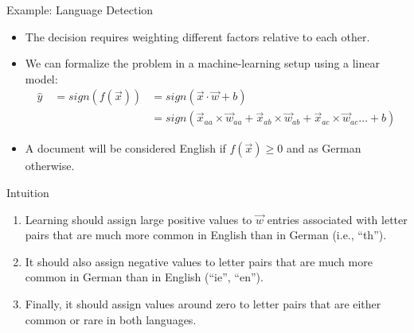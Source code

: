 \documentclass[handout]{beamer}
\begin{document}
\begin{frame}{Example: Language Detection}
\begin{scriptsize}
\begin{itemize}
\item The decision requires weighting different factors relative to each other.
\item We can formalize the problem in a machine-learning setup using a linear model:
\begin{equation}
\begin{split}
\hat{y} \quad = sign(f(\vec{x})) & = sign(\vec{x}\cdot \vec{w} + b) \\ 
& = sign(\vec{x}_{aa}\times \vec{w}_{aa}+ \vec{x}_{ab}\times \vec{w}_{ab}+ \vec{x}_{ac}\times \vec{w}_{ac} \dots +b)
\end{split}
\end{equation}
\item A document will be considered English if $f(\vec{x}) \geq 0$  and as German otherwise.
\end{itemize}

\begin{block}{Intuition}
\begin{enumerate}
\item Learning should assign large positive values to $\vec{w}$ entries associated with letter pairs that are much more common in English than in German (i.e., ``th'').
\item It should also assign negative values to letter pairs that are much more common in German than in English (``ie'', ``en'').
\item Finally, it should assign  values around zero to letter pairs that are either common or rare in both languages.
\end{enumerate}
\end{block}
\end{scriptsize}
\end{frame}
\end{document}
